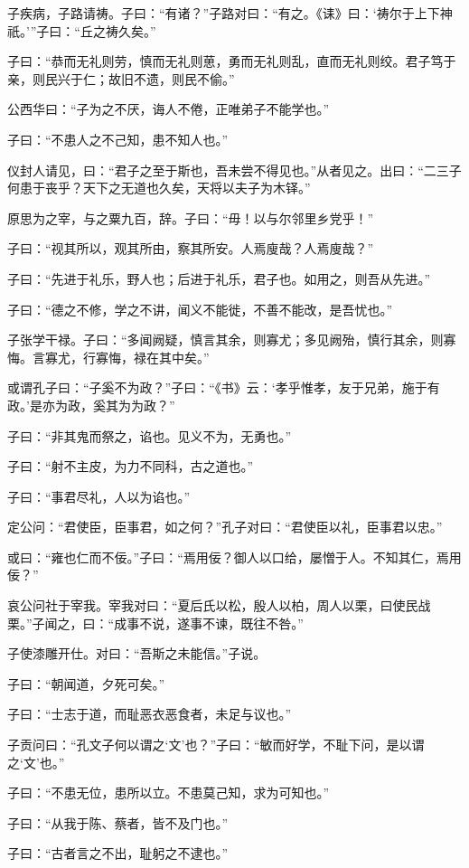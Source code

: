 \documentclass[a5paper]{ctexbook}
\begin{document}
    子疾病，子路请祷。子曰：“有诸？”子路对曰：“有之。《诔》曰：‘祷尔于上下神祇。’”子曰：“丘之祷久矣。”

    子曰：“恭而无礼则劳，慎而无礼则葸，勇而无礼则乱，直而无礼则绞。君子笃于亲，则民兴于仁；故旧不遗，则民不偷。”
    
    公西华曰：“子为之不厌，诲人不倦，正唯弟子不能学也。”

    子曰：“不患人之不己知，患不知人也。”

    仪封人请见，曰：“君子之至于斯也，吾未尝不得见也。”从者见之。出曰：“二三子何患于丧乎？天下之无道也久矣，天将以夫子为木铎。”

    原思为之宰，与之粟九百，辞。子曰：“毋！以与尔邻里乡党乎！”

    子曰：“视其所以，观其所由，察其所安。人焉廋哉？人焉廋哉？”

    子曰：“先进于礼乐，野人也；后进于礼乐，君子也。如用之，则吾从先进。”

    子曰：“德之不修，学之不讲，闻义不能徙，不善不能改，是吾忧也。”

    子张学干禄。子曰：“多闻阙疑，慎言其余，则寡尤；多见阙殆，慎行其余，则寡悔。言寡尤，行寡悔，禄在其中矣。”

    或谓孔子曰：“子奚不为政？”子曰：“《书》云：‘孝乎惟孝，友于兄弟，施于有政。’是亦为政，奚其为为政？”

    子曰：“非其鬼而祭之，谄也。见义不为，无勇也。”

    子曰：“射不主皮，为力不同科，古之道也。”

    子曰：“事君尽礼，人以为谄也。”

    定公问：“君使臣，臣事君，如之何？”孔子对曰：“君使臣以礼，臣事君以忠。”

    或曰：“雍也仁而不佞。”子曰：“焉用佞？御人以口给，屡憎于人。不知其仁，焉用佞？”

    哀公问社于宰我。宰我对曰：“夏后氏以松，殷人以柏，周人以栗，曰使民战栗。”子闻之，曰：“成事不说，遂事不谏，既往不咎。”

    子使漆雕开仕。对曰：“吾斯之未能信。”子说。
    
    子曰：“朝闻道，夕死可矣。”
    
    子曰：“士志于道，而耻恶衣恶食者，未足与议也。”

    子贡问曰：“孔文子何以谓之‘文’也？”子曰：“敏而好学，不耻下问，是以谓之‘文’也。”

    子曰：“不患无位，患所以立。不患莫己知，求为可知也。”

    子曰：“从我于陈、蔡者，皆不及门也。”

    子曰：“古者言之不出，耻躬之不逮也。”
\end{document}
